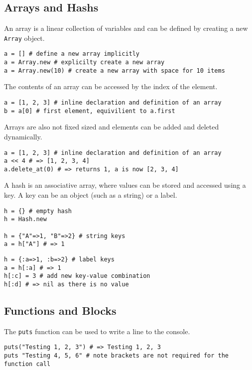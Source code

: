 \begin{bibunit}
\subsection{Arrays and Hashs}
An array is a linear collection of variables and can be defined by creating a new \texttt{Array} object.

\begin{lstlisting}
a = [] # define a new array implicitly
a = Array.new # explicilty create a new array
a = Array.new(10) # create a new array with space for 10 items
\end{lstlisting}

The contents of an array can be accessed by the index of the element. 

\begin{lstlisting}
a = [1, 2, 3] # inline declaration and definition of an array
b = a[0] # first element, equivilient to a.first
\end{lstlisting}

Arrays are also not fixed sized and elements can be added and deleted dynamically.
\begin{lstlisting}
a = [1, 2, 3] # inline declaration and definition of an array
a << 4 # => [1, 2, 3, 4]
a.delete_at(0) # => returns 1, a is now [2, 3, 4]
\end{lstlisting}

A hash is an associative array, where values can be stored and accessed using a key. A key can be an object (such as a string) or a label. 

\begin{lstlisting}
h = {} # empty hash
h = Hash.new

h = {"A"=>1, "B"=>2} # string keys 
a = h["A"] # => 1
\end{lstlisting}

\begin{lstlisting}
h = {:a=>1, :b=>2} # label keys 
a = h[:a] # => 1
h[:c] = 3 # add new key-value combination
h[:d] # => nil as there is no value
\end{lstlisting}

\subsection{Functions and Blocks}
The \texttt{puts} function can be used to write a line to the console.

\begin{lstlisting}
puts("Testing 1, 2, 3") # => Testing 1, 2, 3
puts "Testing 4, 5, 6" # note brackets are not required for the function call
\end{lstlisting}


\end{bibunit}
